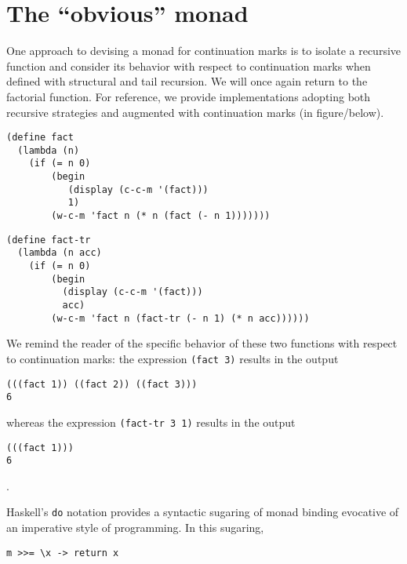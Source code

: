 \documentclass[ms,electronic,twosidetoc,letterpaper,chaptercenter,parttop]{byumsphd}
\title{\Title}
\author{\Author}
\begin{document}
\maketitle
{}

\section{The ``obvious'' monad}

One approach to devising a monad for continuation marks is to isolate a 
recursive function and consider its behavior with respect to continuation 
marks when defined with structural and tail recursion. We will once again 
return to the factorial function. For reference, we provide implementations 
adopting both recursive strategies and augmented with continuation marks 
(in figure/below).

\begin{verbatim}
(define fact
  (lambda (n)
    (if (= n 0)
        (begin
           (display (c-c-m '(fact)))
           1)
        (w-c-m 'fact n (* n (fact (- n 1)))))))
\end{verbatim}

\begin{verbatim}
(define fact-tr
  (lambda (n acc)
    (if (= n 0)
        (begin
          (display (c-c-m '(fact)))
          acc)
        (w-c-m 'fact n (fact-tr (- n 1) (* n acc))))))
\end{verbatim}

We remind the reader of the specific behavior of these two functions with 
respect to continuation marks: the expression \texttt{(fact 3)} results in 
the output

\begin{verbatim}
(((fact 1)) ((fact 2)) ((fact 3)))
6
\end{verbatim}

whereas the expression \texttt{(fact-tr 3 1)} results in the output

\begin{verbatim}
(((fact 1)))
6
\end{verbatim}.

Haskell's \texttt{do} notation provides a syntactic sugaring of monad binding 
evocative of an imperative style of programming. In this sugaring, 

\begin{verbatim}
m >>= \x -> return x
\end{verbatim}
\end{document}
